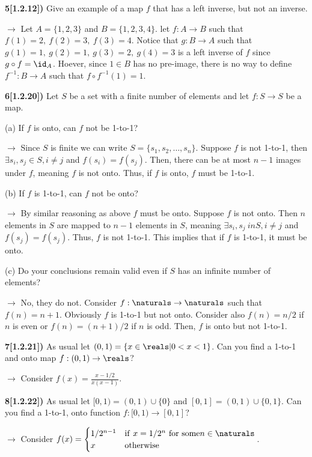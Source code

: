 \documentclass[12pt,a4paper]{article}
\newcommand{\prob}[2]{\textbf{#1)} #2}
\begin{document}
\prob{5[1.2.12]}{Give an example of a map $f$ that has a left inverse, but not an inverse.}

$\rightarrow$ Let $A = \{1,2,3\}$ and $B = \{1,2,3,4\}$. let $f: A \rightarrow B$ such that $f(1) = 2,~f(2)=3,~f(3)=4$. Notice that $g: B \rightarrow A$ such that $g(1)=1,~g(2)=1,~g(3)=2,~g(4)=3$ is a left inverse of $f$ since $g \circ f = \id_{A}$. Hoever, since $1 \in B$ has no pre-image, there is no way to define $f^{-1}: B \rightarrow A$ such that $f \circ f^{-1}(1) = 1$.

\prob{6[1.2.20]}{Let $S$ be a set with a finite number of elements and let $f: S \rightarrow S$ be a map.}

(a) If $f$ is onto, can $f$ not be 1-to-1?

$\rightarrow$ Since $S$ is finite we can write $S = \{s_1,s_2,\hdots,s_n\}$. Suppose $f$ is not 1-to-1, then $\exists s_i, s_j \in S, i \not= j$ and $f(s_i) = f(s_j)$. Then, there can be at most $n-1$ images under $f$, meaning $f$ is not onto. Thus, if $f$ is onto, $f$ must be 1-to-1.

(b) If $f$ is 1-to-1, can $f$ not be onto?

$\rightarrow$ By similar reasoning as above $f$ must be onto. Suppose $f$ is not onto. Then $n$ elements in $S$ are mapped to $n-1$ elements in $S$, meaning $\exists s_i,s_j \ in S, i \not= j$ and $f(s_j) = f(s_j)$. Thus, $f$ is not 1-to-1. This implies that if $f$ is 1-to-1, it must be onto.

(c) Do your conclusions remain valid even if $S$ has an infinite number of elements?

$\rightarrow$ No, they do not. Consider $f: \naturals \rightarrow \naturals$ such that $f(n) = n+1$. Obviously $f$ is 1-to-1 but not onto. Consider also $f(n) = n/2$ if $n$ is even or $f(n) = (n+1)/2$ if $n$ is odd. Then, $f$ is onto but not 1-to-1.

\prob{7[1.2.21]}{As usual let $(0,1) = \{x \in \reals | 0 < x < 1\}$. Can you find a 1-to-1 and onto map $f: (0,1) \rightarrow \reals$?}

$\rightarrow$ Consider $f(x) = \frac{x-1/2}{x(x-1)}$.

\prob{8[1.2.22]}{As usual let $[0,1) = (0,1)\cup\{0\}$ and $[0,1] = (0,1)\cup\{0,1\}$. Can you find a 1-to-1, onto function $f: [0,1) \rightarrow [0,1]$?}

$\rightarrow$ Consider $f(x) = \begin{cases} 1/2^{n-1} & {\rm if~} x = 1/2^{n} {\rm ~for~some} n \in \naturals \\ x & {\rm otherwise}\end{cases}$.
\end{document}
